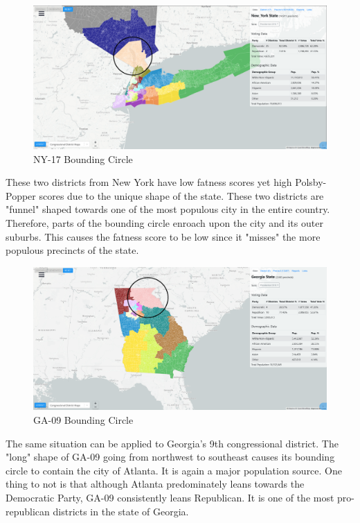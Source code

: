 \documentclass[letterpaper]{article}
\begin{document}
\begin{figure}[H]
	\includegraphics[width=\linewidth]{./figures/NY-17-BoundingCircle.png}
	\caption{NY-17 Bounding Circle}
	\label{fig:ny17boundingCircle}
\end{figure}

These two districts from New York have low fatness scores yet high Polsby-Popper scores due to the unique shape of the state. These two districts are "funnel" shaped towards one of the most populous city in the entire country. Therefore, parts of the bounding circle enroach upon the city and its outer suburbs. This causes the fatness score to be low since it "misses" the more populous precincts of the state.

\begin{figure}[H]
	\includegraphics[width=\linewidth]{./figures/GA-09-BoundingCircle.png}
	\caption{GA-09 Bounding Circle}
	\label{fig:ga09boundingCircle}
\end{figure}

The same situation can be applied to Georgia's 9th congressional district. The "long" shape of GA-09 going from northwest to southeast causes its bounding circle to contain the city of Atlanta. It is again a major population source. One thing to not is that although Atlanta predominately leans towards the Democratic Party, GA-09 consistently leans Republican. It is one of the most pro-republican districts in the state of Georgia.
\end{document}
